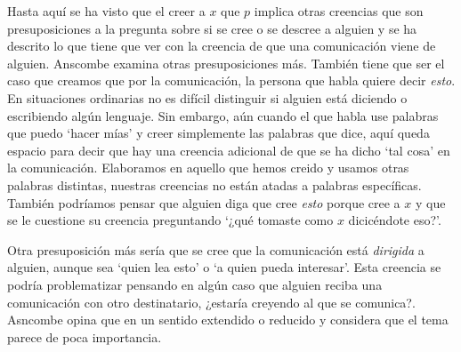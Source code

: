 Hasta aquí se ha visto que el creer a $x$ que $p$ implica otras creencias que
son presuposiciones a la pregunta sobre si se cree o se descree a alguien y se
ha descrito lo que tiene que ver con la creencia de que una comunicación viene
de alguien. Anscombe examina otras presuposiciones más. También tiene que ser el
caso que creamos que por la comunicación, la persona que habla quiere decir
\emph{esto}. En situaciones ordinarias no es difícil distinguir si alguien está
diciendo o escribiendo algún lenguaje. Sin embargo, aún cuando el que habla use
palabras que puedo `hacer mías' y creer simplemente las palabras que dice, aquí
queda espacio para decir que hay una creencia adicional de que se ha dicho `tal
cosa' en la comunicación. Elaboramos en aquello que hemos creido y usamos otras
palabras distintas, nuestras creencias no están atadas a palabras específicas.
También podríamos pensar que alguien diga que cree \emph{esto} porque cree a $x$
y que se le cuestione su creencia preguntando `¿qué tomaste como $x$ dicicéndote
eso?'.

Otra presuposición más sería que se cree que la comunicación está
\emph{dirigida} a alguien, aunque sea `quien lea esto' o `a quien pueda
interesar'. Esta creencia se podría problematizar pensando en algún caso que
alguien reciba una comunicación con otro destinatario, ¿estaría creyendo al que
se comunica?. Asncombe opina que en un sentido extendido o reducido y considera
que el tema parece de poca
importancia\autocite[Cf.~][7]{anscombe2008faith:tobelieve}.

